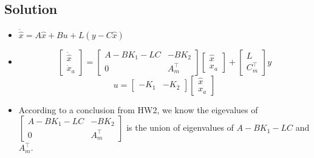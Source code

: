 \documentclass[11pt]{report}
\newcommand{\T}{\intercal}
\begin{document}

\subsection*{Solution}
\begin{itemize}
\item $\dot{\hat{x}} = A \hat{x} + Bu + L(y - C\hat{x})$
\item $$\begin{bmatrix} \dot{\hat{x}}\\ \dot{x}_a \end{bmatrix} = \begin{bmatrix} A-BK_1-LC & -BK_2 \\0 & A_m^\T \end{bmatrix} \begin{bmatrix} \hat{x}\\ x_a \end{bmatrix} + \begin{bmatrix} L\\ C_m^\T \end{bmatrix} y$$
$$u = \begin{bmatrix} -K_1 & -K_2 \end{bmatrix} \begin{bmatrix} \hat{x}\\ x_a \end{bmatrix}$$
\item According to a conclusion from HW2, we know the eigevalues of $\begin{bmatrix} A-BK_1-LC & -BK_2 \\0 & A_m^\T \end{bmatrix}$ is the union of eigenvalues of $A-BK_1-LC$ and $A_m^\T$.
\end{itemize}

\end{document}
